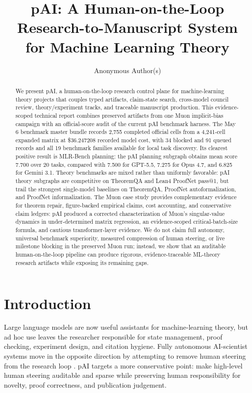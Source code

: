 \documentclass{article}
\title{pAI: A Human-on-the-Loop Research-to-Manuscript System\\for Machine Learning Theory}
\author{Anonymous Author(s)}
\begin{document}
\maketitle

\begin{abstract}
We present pAI, a human-on-the-loop research control plane for machine-learning theory projects that couples typed artifacts, claim-state search, cross-model council review, theory/experiment tracks, and traceable manuscript production. This evidence-scoped technical report combines preserved artifacts from one Muon implicit-bias campaign with an official-score audit of the current pAI benchmark harness. The May 6 benchmark master bundle records 2,755 completed official cells from a 4,241-cell expanded matrix at \$36.247208 recorded model cost, with 34 blocked and 91 queued records and all 19 benchmark families available for local task discovery. Its clearest positive result is MLR-Bench planning: the pAI planning subgraph obtains mean score 7.700 over 20 tasks, compared with 7.500 for GPT-5.5, 7.275 for Opus 4.7, and 6.825 for Gemini 3.1. Theory benchmarks are mixed rather than uniformly favorable: pAI theory subgraphs are competitive on TheoremQA and Lean4 ProofNet pass@1, but trail the strongest single-model baselines on TheoremQA, ProofNet autoformalization, and ProofNet informalization. The Muon case study provides complementary evidence for theorem repair, figure-backed empirical claims, cost accounting, and conservative claim ledgers: pAI produced a corrected characterization of Muon's singular-value dynamics in under-determined matrix regression, an evidence-scoped critical-batch-size formula, and cautious transformer-layer evidence. We do not claim full autonomy, universal benchmark superiority, measured compression of human steering, or live milestone blocking in the preserved Muon run; instead, we show that an auditable human-on-the-loop pipeline can produce rigorous, evidence-traceable ML-theory research artifacts while exposing its remaining gaps.
\end{abstract}

\section{Introduction}
Large language models are now useful assistants for machine-learning theory, but ad hoc use leaves the researcher responsible for state management, proof checking, experiment design, and citation hygiene. Fully autonomous AI-scientist systems move in the opposite direction by attempting to remove human steering from the research loop \citep{lu2024aiscientist,yamada2025aiscientistv2,jiang2025aide,gottweis2025coscientist}. pAI targets a more conservative point: make high-level human steering auditable and sparse while preserving human responsibility for novelty, proof correctness, and publication judgement.
\end{document}
